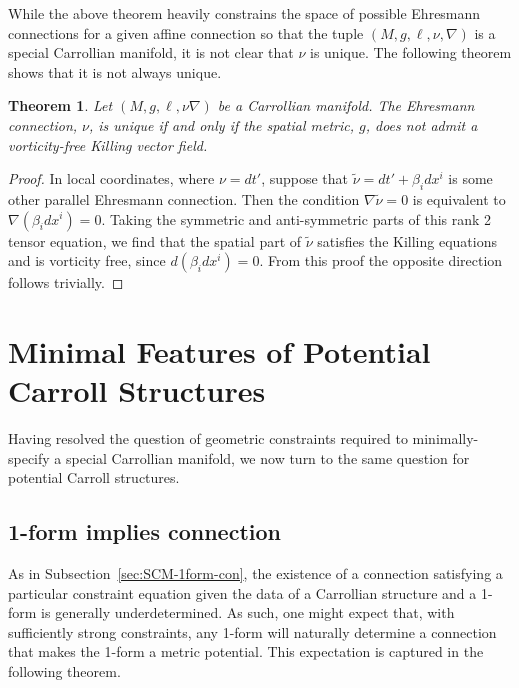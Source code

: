 \documentclass{article}
\newtheorem{theorem}{Theorem}[section]
\theoremstyle{definition}
\theoremstyle{remark}
\begin{document}
While the above theorem heavily constrains the space of possible Ehresmann connections for a given affine connection so that the tuple $(M,g,\ell,\nu,\nabla)$ is a special Carrollian manifold, it is not clear that $\nu$ is unique. The following theorem shows that it is not always unique.

\begin{theorem}
    Let $(M,g,\ell, \nu \nabla)$ be a Carrollian manifold. The Ehresmann connection, $\nu$, is unique if and only if the spatial metric, $g$, does not admit a vorticity-free Killing vector field. 
\end{theorem}

\begin{proof}
    In local coordinates, where $\nu = dt'$, suppose that $\tilde{\nu} = dt' + \beta_i dx^i$ is some other parallel Ehresmann connection. Then the condition $\nabla \tilde{\nu} = 0$ is equivalent to $\nabla (\beta_i dx^i) = 0$. Taking the symmetric and anti-symmetric parts of this rank 2 tensor equation, we find that the spatial part of $\tilde{\nu}$ satisfies the Killing equations and is vorticity free, since $d(\beta_i dx^i ) =0$. From this proof the opposite direction follows trivially. 
\end{proof}




\section{Minimal Features of Potential Carroll Structures}\label{sec:PCSs}

Having resolved the question of geometric constraints required to minimally-specify a special Carrollian manifold, we now turn to the same question for potential Carroll structures.

\subsection{1-form implies connection}
As in Subsection~\ref{sec:SCM-1form-con}, the existence of a connection satisfying a particular constraint equation given the data of a Carrollian structure and a 1-form is generally underdetermined. As such, one might expect that, with sufficiently strong constraints, any 1-form will naturally determine a connection that makes the 1-form a metric potential. This expectation is captured in the following theorem.
\end{document}
